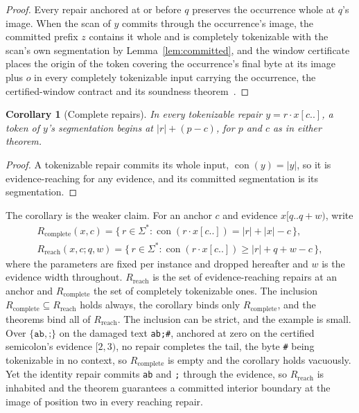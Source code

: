 \documentclass[11pt,a4paper]{article}
\theoremstyle{definition}
\theoremstyle{plain}
\newtheorem{corollary}{Corollary}
\theoremstyle{remark}
\newcommand{\code}[1]{\texttt{#1}}
\newcommand{\Rreach}{R_{\mathrm{reach}}}
\newcommand{\Rcomp}{R_{\mathrm{complete}}}
\newcommand{\suffix}[2]{#1[#2..]}
\newcommand{\window}[3]{#1[#2..#3)}
\newcommand{\con}{\operatorname{con}}
\begin{document}
\begin{proof}
Every repair anchored at or before $q$ preserves the occurrence whole at $q$'s image. When the scan of $y$ commits
through the occurrence's image, the committed prefix $z$ contains it whole and is completely tokenizable with the scan's
own segmentation by Lemma~\ref{lem:committed}, and the window certificate places the origin of the token covering the
occurrence's final byte at its image plus $o$ in every completely tokenizable input carrying the occurrence, the
certified-window contract and its soundness theorem~\citep[Definition~1 and Theorem~1, arXiv v1]{splitwindows2026}.
\end{proof}

\begin{corollary}[Complete repairs]
\label{cor:complete}
In every tokenizable repair $y = r \cdot \suffix{x}{c}$, a token of $y$'s segmentation begins at $|r| + (p - c)$, for
$p$ and $c$ as in either theorem.
\end{corollary}

\begin{proof}
A tokenizable repair commits its whole input, $\con(y) = |y|$, so it is evidence-reaching for any evidence, and its
committed segmentation is its segmentation.
\end{proof}

The corollary is the weaker claim. For an anchor $c$ and evidence $\window{x}{q}{q+w}$, write
\begin{gather*}
\Rcomp(x, c) = \{\, r \in \Sigma^* : \con(r \cdot \suffix{x}{c}) = |r| + |x| - c \,\}, \\
\Rreach(x, c; q, w) = \{\, r \in \Sigma^* : \con(r \cdot \suffix{x}{c}) \ge |r| + q + w - c \,\},
\end{gather*}
where the parameters are fixed per instance and dropped hereafter and $w$ is the evidence width throughout. $\Rreach$ is
the set of evidence-reaching repairs at an anchor and $\Rcomp$ the set of completely tokenizable ones. The inclusion
$\Rcomp \subseteq \Rreach$ holds always, the corollary binds only $\Rcomp$, and the theorems bind all of $\Rreach$. The
inclusion can be strict, and the example is small. Over $\{\code{ab}, \code{;}\}$ on the damaged text \code{ab;\#},
anchored at zero on the certified semicolon's evidence $[2,3)$, no repair completes the tail, the byte \code{\#} being
tokenizable in no context, so $\Rcomp$ is empty and the corollary holds vacuously. Yet the identity repair commits
\code{ab} and \code{;} through the evidence, so $\Rreach$ is inhabited and the theorem guarantees a committed interior
boundary at the image of position two in every reaching repair.
\end{document}
